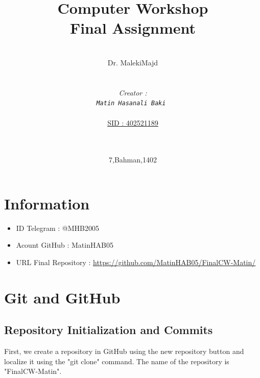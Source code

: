 \documentclass[12pt]{article}
\begin{document}
\title{Computer Workshop\\Final Assignment} 
\date{ 7,Bahman,1402 } %
\author{\\ Dr. MalekiMajd \\ \\ \\ \emph{Creator :}\\ \emph{\texttt{Matin Hasanali Baki }}  \\ \\ \underline{SID :    402521189} \\ \\ \\  }
\maketitle

\newpage
\begin{quote}
\end{quote}
\tableofcontents

\newpage




\section*{Information}
\begin{itemize}
  \item ID Telegram : @MHB2005 
  \item Acount GitHub : MatinHAB05 
  \item URL Final Repository : \href{ https://github.com/MatinHAB05/FinalCW-Matin/}{\underline{https://github.com/MatinHAB05/FinalCW-Matin/}}
  \end{itemize}
  


\section{Git and GitHub}
\subsection{Repository Initialization and Commits}
First, we create a repository in GitHub using the new repository button and localize it using the "git clone" command.\newline
The name of the repository is "FinalCW-Matin".
\end{document}
